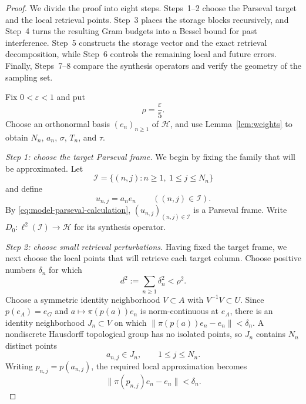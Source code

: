 \documentclass[10pt,a4paper]{amsart}
\numberwithin{equation}{section}
\newcommand{\cH}{\mathcal H}
\newcommand{\cI}{\mathcal I}
\newcommand{\Step}[1]{\par\medskip\noindent\textit{#1.}\quad}
\begin{document}
\begin{proof}
We divide the proof into eight steps.  Steps~1--2 choose the Parseval target
and the local retrieval points.  Step~3 places the storage blocks recursively,
and Step~4 turns the resulting Gram budgets into a Bessel bound for past
interference.  Step~5 constructs the storage vector and the exact retrieval
decomposition, while Step~6 controls the remaining local and future errors.
Finally, Steps~7--8 compare the synthesis operators and verify the geometry
of the sampling set.

Fix $0<\varepsilon<1$ and put
\begin{equation}\label{eq:rho-choice}
   \rho=\frac{\varepsilon}{5}.
\end{equation}
Choose an orthonormal basis $(e_n)_{n\geq1}$ of $\cH$, and use
Lemma~\ref{lem:weights} to obtain $N_n$, $a_n$, $\sigma$, $T_n$, and $\tau$.

\Step{Step 1: choose the target Parseval frame}
We begin by fixing the family that will be approximated.  Let
\[
 \cI=\{(n,j):n\geq1,\ 1\leq j\leq N_n\}
\]
and define
\begin{equation}\label{eq:target-parseval}
 u_{n,j}=a_ne_n\qquad((n,j)\in\cI).
\end{equation}
By \eqref{eq:model-parseval-calculation}, $(u_{n,j})_{(n,j)\in\cI}$ is a
Parseval frame.  Write $D_0:\ell^2(\cI)\to\cH$ for its synthesis operator.

\Step{Step 2: choose small retrieval perturbations}
Having fixed the target frame, we next choose the local points that will
retrieve each target column.  Choose positive numbers $\delta_n$ for which
\begin{equation}\label{eq:d-definition}
 d^2:=\sum_{n\geq1}\delta_n^2<\rho^2.
\end{equation}
Choose a symmetric identity neighborhood $V\subset A$ with
$V^{-1}V\subset U$.  Since $p(e_A)=e_G$ and $a\mapsto\pi(p(a))e_n$ is
norm-continuous at $e_A$, there is an identity neighborhood $J_n\subset V$
on which $\|\pi(p(a))e_n-e_n\|<\delta_n$.  A nondiscrete Hausdorff
topological group has no isolated points, so $J_n$ contains $N_n$ distinct
points
\begin{equation}\label{eq:retrieval-points}
 a_{n,j}\in J_n,\qquad 1\leq j\leq N_n.
\end{equation}
Writing $p_{n,j}=p(a_{n,j})$, the required local approximation becomes
\begin{equation}\label{eq:retrieval-small}
 \|\pi(p_{n,j})e_n-e_n\|<\delta_n.
\end{equation}


\end{proof}
\end{document}
